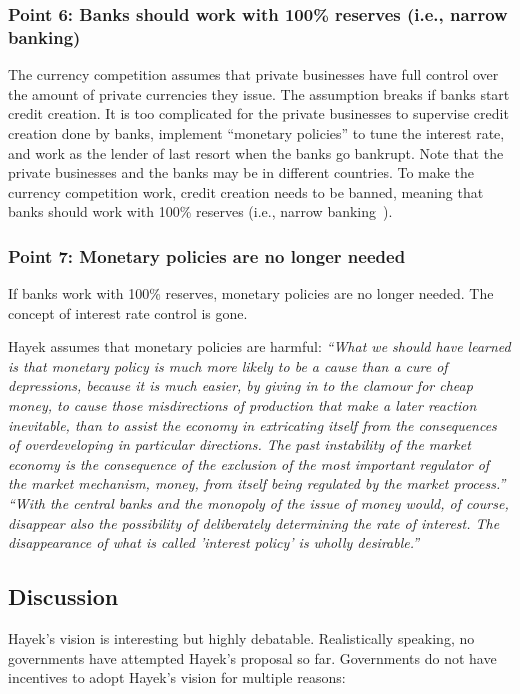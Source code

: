 \documentclass[dvipdfmx,a4paper]{article}
\begin{document}
\subsubsection{Point 6: Banks should work with 100\% reserves (i.e., narrow banking)}

The currency competition assumes that private businesses have full control over the amount of private currencies they issue. The assumption breaks if banks start credit creation. It is too complicated for the private businesses to supervise credit creation done by banks, implement ``monetary policies'' to tune the interest rate, and work as the lender of last resort when the banks go bankrupt. Note that the private businesses and the banks may be in different countries. To make the currency competition work, credit creation needs to be banned, meaning that banks should work with 100\% reserves (i.e., narrow banking~\cite{pennacchi2012narrow,kay2009narrow}).

\subsubsection{Point 7: Monetary policies are no longer needed}

If banks work with 100\% reserves, monetary policies are no longer needed. The concept of interest rate control is gone.

Hayek assumes that monetary policies are harmful: \textit{``What we should have learned is that monetary policy is much more likely to be a cause than a cure of depressions, because it is much easier, by giving in to the clamour for cheap money, to cause those misdirections of production that make a later reaction inevitable, than to assist the economy in extricating itself from the consequences of overdeveloping in particular directions. The past instability of the market economy is the consequence of the exclusion of the most important regulator of the market mechanism, money, from itself being regulated by the market process.''} \textit{``With the central banks and the monopoly of the issue of money would, of course, disappear also the possibility of deliberately determining the rate of interest. The disappearance of what is called 'interest policy' is wholly desirable.''}

\subsection{Discussion}

Hayek's vision is interesting but highly debatable. Realistically speaking, no governments have attempted Hayek's proposal so far. Governments do not have incentives to adopt Hayek's vision for multiple reasons:
\end{document}
